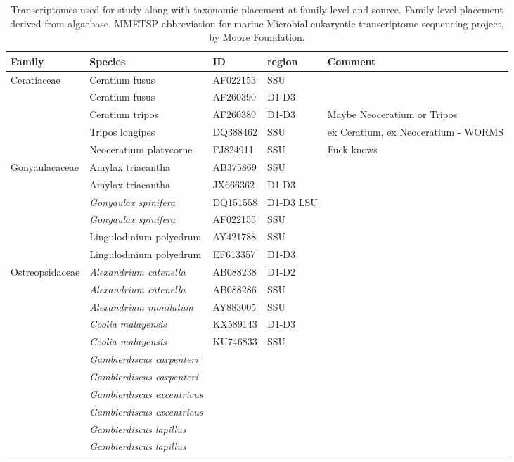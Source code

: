 \documentclass[12pt]{article}
\begin{document}
\FloatBarrier
\begin{table}
\caption{Transcriptomes used for study along with taxonomic placement at family level and source. Family level placement derived from algaebase. MMETSP abbreviation for marine Microbial eukaryotic transcriptome sequencing project, by Moore Foundation.}
\label{tbl:Transcriptomes}
\begin{tabular}{  | p{3cm} |p{4cm} | p{2cm} | p{3cm} | p{3cm}  |}
\hline
\textbf{Family}&\textbf{Species}&\textbf{ID}& \textbf{region} &\textbf{Comment}\\
\hline
Ceratiaceae& Ceratium fusus&AF022153&SSU&\\
\hline
&Ceratium fusus&AF260390&D1-D3&\\
\hline
&Ceratium tripos&AF260389&D1-D3&Maybe Neoceratium or Tripos\\
&Tripos longipes&DQ388462&SSU&ex Ceratium, ex Neoceratium - WORMS\\
\hline
&Neoceratium platycorne&FJ824911&SSU&Fuck knows\\
\hline
Gonyaulacaceae&Amylax triacantha&AB375869&SSU&\\
\hline
&Amylax triacantha&JX666362&D1-D3&\\
\hline
&\emph{Gonyaulax spinifera}&DQ151558&D1-D3 LSU&\\
\hline
&\emph{Gonyaulax spinifera}&AF022155&SSU&\\
\hline
&Lingulodinium polyedrum&AY421788&SSU&\\
\hline
&Lingulodinium polyedrum&EF613357&D1-D3&\\
\hline
Ostreopsidaceae&\emph{Alexandrium catenella}&AB088238&D1-D2&\\
\hline
&\emph{Alexandrium catenella}&AB088286&SSU&\\
\hline
&\emph{Alexandrium monilatum}&AY883005&SSU&\\
\hline
&\emph{Coolia malayensis}&KX589143&D1-D3&\\
\hline
&\emph{Coolia malayensis}&KU746833&SSU&\\
\hline
&\emph{Gambierdiscus carpenteri}&&&\\
\hline
&\emph{Gambierdiscus carpenteri}&&&\\
\hline
&\emph{Gambierdiscus excentricus}&&&\\
\hline
&\emph{Gambierdiscus excentricus}&&&\\
\hline
&\emph{Gambierdiscus lapillus}&&&\\
\hline
&\emph{Gambierdiscus lapillus}&&&\\
\hline

\end{tabular}
\end{table}
\end{document}
